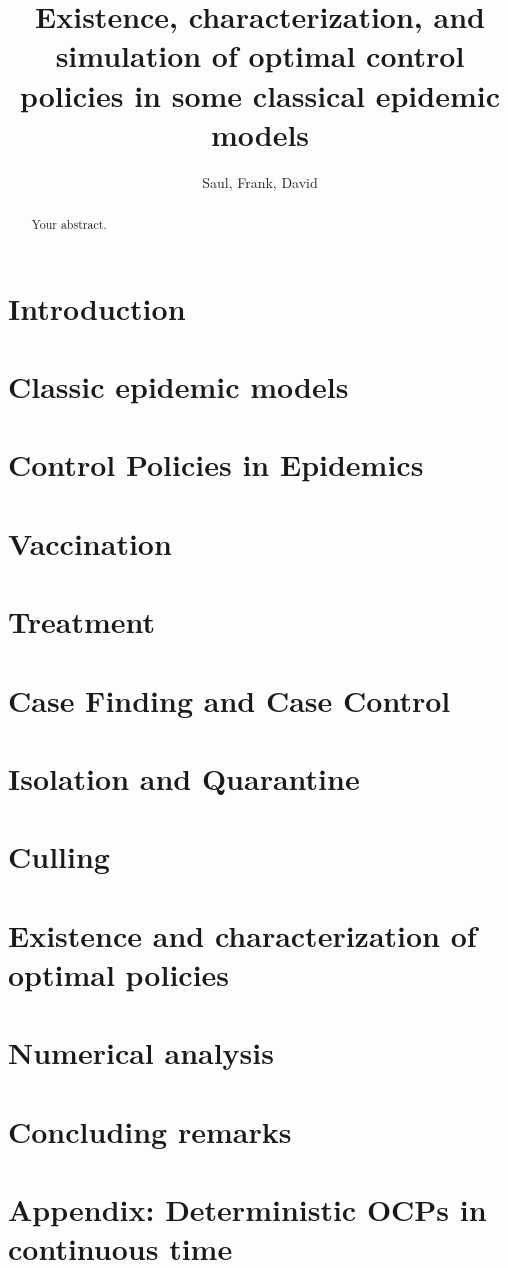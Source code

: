 \documentclass[a4paper]{amsart}
\title[%
	Existence, characterization and simulation of OCP for some epidemic 
	Models%
	]{
	Existence, characterization, and simulation
	of optimal control policies in some classical epidemic models
}
\author{Saul, Frank, David}
\begin{document}
	\maketitle
  \begin{abstract}
  	Your abstract.
  \end{abstract}
%
%
  \section{Introduction}
    
  
  \section{Classic epidemic models}
    
  \section{Control Policies in Epidemics}
    
  \section{Vaccination}
    
  \section{Treatment}
    
  \section{Case Finding and Case Control}
    
  \section{Isolation and Quarantine}
    
  \section{Culling}
    
 
 
  \section{Existence and characterization of optimal policies}
 
 
 
  \section{Numerical analysis}
    
 
  \section{Concluding remarks}

\section{Appendix: Deterministic OCPs in continuous time}
    
%
%

  
  
\end{document}
